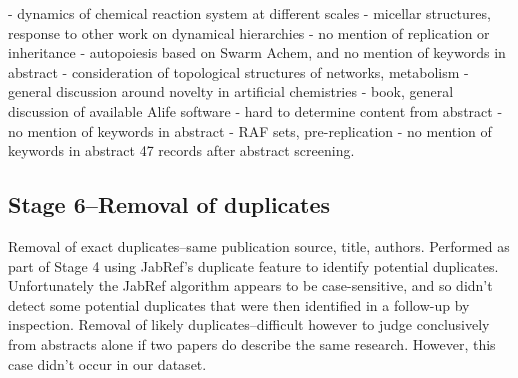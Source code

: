 \cite{smDecraeneMcmullin2011}
\cite{smMadinaIkegami2004}
\cite{smHutton2003}
\cite{smKvasnicka2002}
\cite{smBedauMcCaskillPackardEtAl2000}
\cite{smSuzukiDittrich2009}
\cite{smBanzhafBaumgaertnerBeslonEtAl2016}
\cite{smBanzhafMcMullin2012}
\cite{smBersini2010}
\cite{smEibenKernbachHaasdijk2012}
\cite{smGarzonBlainBobbaEtAl2003}
\cite{smGohEweGoh2013}
\cite{smHarrisChen2012}
\cite{smHutton2003a}
\cite{smIngerSolomonShenhavEtAl2009}
\cite{smKobayashiSuzukiArita2012}
\cite{smKvasnickaPospichalKalab2001}
\cite{smMadinaOnoIkegami2003}
\cite{smMenezesCosta2007}
\cite{smSperonidiFenizioDittrich2007} - dynamics of chemical reaction system at different scales
\cite{smStadler2016}
\cite{smSuzukiIkegami2003}
\cite{smGrossMcMullin2002} - micellar structures, response to other work on dynamical hierarchies
\cite{smFenizioBanzhaf2001} - no mention of replication or inheritance
\cite{smMcMullinGros2001} - autopoiesis based on Swarm Achem, and no mention of keywords in abstract
\cite{smOnoFujiwaraYuta2005} - consideration of topological structures of networks, metabolism
\cite{smGrosMcMullin2003} - general discussion around novelty in artificial chemistries
\cite{smKomosinskiAdamatzky2009} - book, general discussion of available Alife software
\cite{smMarro2013} - hard to determine content from abstract
\cite{smGazzolaBuchananPackardEtAl2007} - no mention of keywords in abstract
\cite{smFilisettiVillaniDamianiEtAl2014} - RAF sets, pre-replication
\cite{smSuzuki2011} - no mention of keywords in abstract
47 records after abstract screening.

\subsection{Stage 6--Removal of duplicates}

Removal of exact duplicates--same publication source, title, authors. Performed as part of Stage 4 using JabRef's duplicate feature to identify potential duplicates. Unfortunately the JabRef algorithm appears to be case-sensitive, and so didn't detect some potential duplicates that were then identified in a follow-up by inspection.
Removal of likely duplicates--difficult however to judge conclusively from abstracts alone if two papers do describe the same research. However, this case didn't occur in our dataset.


